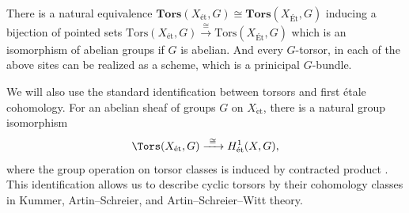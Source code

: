 \begin{cor}
    There is a natural equivalence $\mathbf{Tors}(X_{\mathrm{\text{\'et}}}, G) \cong \mathbf{Tors}(X_{\text{\'Et}}, G)$ 
    inducing a bijection of pointed sets $\mathrm{Tors}(X_{\text{\'et}}, G) \xrightarrow{\cong} \mathrm{Tors}(X_{\text{\'Et}}, G)$ 
    which is an isomorphism of abelian groups if $G$ is abelian.
    And every $G$-torsor, in each of the above sites can be realized as a scheme, which is a prinicipal $G$-bundle.
\end{cor}





We will also use the standard identification between torsors and first
\'etale cohomology. For an abelian sheaf of groups $G$ on
$X_{\mathrm{\acute et}}$, there is a natural group isomorphism
\[
\Tors(X_{\mathrm{\acute et}},G)\xrightarrow{\ \cong\ }
H^1_{\mathrm{\acute et}}(X,G),
\]
where the group operation on torsor classes is induced by contracted
product \cite[III, \S4, Proposition~4.6 and Remark~4.8(b)]{milneEC}. This identification allows us to describe
cyclic torsors by their cohomology classes in Kummer, Artin--Schreier, and
Artin--Schreier--Witt theory.



